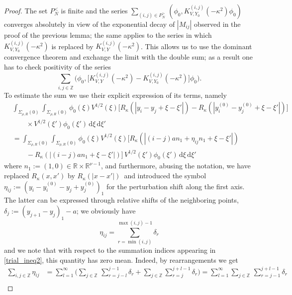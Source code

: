 \documentclass{article}
\numberwithin{equation}{section}
\theoremstyle{definition}
\newcommand{\D}{\mathrm{d}}
\newcommand{\R}{\mathbb{R}}
\newcommand{\Z}{\mathbb{Z}}
\begin{document}
\begin{proof}
The set $P_N^<$ is finite and the series $\sum_{(i,j)\in P_N^>}\, (\phi_0,K_{V,Y_0}^{(i,j)}(-\kappa^2)\phi_0)$ converges absolutely in view of the exponential decay of $|M_{ij}|$ observed in the proof of the previous lemma; the same applies to the series in which $K_{V,Y_0}^{(i,j)}(-\kappa^2)$ is replaced by $K_{V,Y}^{(i,j)}(-\kappa^2)$. This allows us to use the dominant convergence theorem and exchange the limit with the double sum; as a result one has to check positivity of the series
 \begin{equation} \label{trial_ineq2}
\sum_{i,j\in\Z}\big(\phi_0, \big[K_{V,Y}^{(i,j)}(-\kappa^2) - K_{V,Y_0}^{(i,j)}(-\kappa^2)\big]\phi_0\big).
\end{equation}
To estimate the sum we use their explicit expression of its terms, namely
 \begin{align*}
& \int_{\Sigma_{\rho,R}(0)} \int_{\Sigma_{\rho,R}(0)} \phi_0(\xi) V^{1/2}(\xi) \big[ R_\kappa(|y_i-y_j +\xi-\xi'|) - R_\kappa(|y_i^{(0)}\!-y_j^{(0)}\! +\xi-\xi'|) \big] \\[.3em] & \qquad \times V^{1/2}(\xi') \phi_0(\xi') \,\D\xi\,\D\xi' \\[.3em]
& = \int_{\Sigma_{\rho,R}(0)} \int_{\Sigma_{\rho,R}(0)} \phi_0(\xi) V^{1/2}(\xi) \big[ R_\kappa(|(i-j)an_1 + \eta_{ij}n_1 +\xi-\xi'|) \\[.3em] & \qquad - R_\kappa(|(i-j)an_1+\xi-\xi'|) \big]\, V^{1/2}(\xi') \phi_0(\xi') \,\D\xi\,\D\xi'
 \end{align*}
where $n_1:=(1,0)\in \R\times\R^{\nu-1}$, and furthermore, abusing the notation, we have replaced $R_\kappa(x,x')$ by $R_\kappa(|x-x'|)$\ and introduced the symbol $\eta_{ij}:= (y_i-y_i^{(0)} - y_j+y_j^{(0)})_1$ for the perturbation shift along the first axis. The latter can be expressed through relative shifts of the neighboring points, $\delta_j:= (y_{j+1}-y_j)_1-a$; we obviously have
\begin{equation*}
\eta_{ij} = \sum_{r=\min(i,j)}^{\max(i,j)-1} \delta_r
\end{equation*}
and we note that with respect to the summation indices appearing in \eqref{trial_ineq2}, this quantity has zero mean. Indeed, by rearrangements we get
\begin{align*}
\sum_{i,j\in\Z} \eta_{ij} & = \sum_{l=1}^\infty \Big( \sum_{j\in\Z}\, \sum_{r=j-l}^{j-1} \delta_r + \sum_{j\in\Z} \sum_{r=j}^{j+l-1} \delta_r \Big) = \sum_{l=1}^\infty \sum_{j\in\Z}\, \sum_{r=j-1}^{j+l-1} \delta_r \\[.3em]

\end{align*}
\end{proof}
\end{document}
